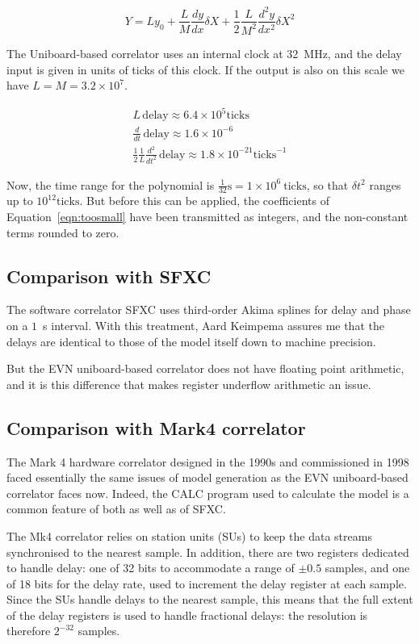 \documentclass[a4paper]{article}
\begin{document}
\begin{equation*}
  Y = L y_0 + \frac{L}{M} \frac{dy}{dx}\delta X + \frac{1}{2}\frac{L}{M^2} \frac{d^2y}{dx^2} \delta X^2
\end{equation*}

The Uniboard-based correlator uses an internal clock at 32~MHz, and the delay input is given in units of ticks of this clock.  If the output is also on this scale we have $L = M = 3.2\times 10^{7}$.

\begin{eqnarray}
\label{eqn:toosmall}
 L\, \mathrm{delay} \approx 6.4\times 10^5 \mathrm{ticks}\\
\frac{d}{dt}\,\mathrm{delay} \approx 1.6\times 10^{-6}  \\
\frac{1}{2} \frac{1}{L}\frac{d^2}{dt^2}\,\mathrm{delay} \approx 1.8\times 10^{-21} \mathrm{ticks}^{-1}
\end{eqnarray}

Now, the time range for the polynomial is $\frac{1}{32} \mathrm{s} =
1\times10^6\ \mathrm{ticks}$, so that $\delta t^2$ ranges up to $10^{12}
\mathrm{ticks}$.  But before this can be applied, the coefficients of
Equation~\ref{eqn:toosmall} have been transmitted as integers, and the
non-constant terms rounded to zero.

\subsection{Comparison with SFXC}
The software correlator SFXC uses third-order Akima splines
for delay and phase on a $1$~s interval.  With this treatment, Aard Keimpema assures me that the delays are identical to those of the model itself down to machine precision.

But the EVN uniboard-based correlator does not have floating point arithmetic, and it is this difference that makes register underflow arithmetic an issue.  

\subsection{Comparison with Mark4 correlator}
The Mark 4 hardware correlator designed in the 1990s and commissioned in 1998 faced essentially the same issues of model generation as the EVN uniboard-based correlator faces now.  Indeed, the CALC program used to calculate the model is a common feature of both as well as of SFXC.

The Mk4 correlator relies on station units (SUs) to keep the data
streams synchronised to the nearest sample.  In addition, there are
two registers dedicated to handle delay: one of 32 bits to accommodate
a range of $\pm 0.5$ samples, and one of 18 bits for the delay rate,
used to increment the delay register at each sample.  Since the SUs handle delays to the nearest sample, this means that the full extent of the delay registers is used to handle fractional delays: the resolution is therefore $2^{-32}$ samples.
\end{document}

